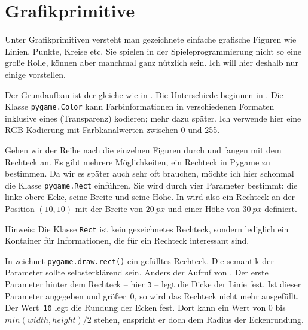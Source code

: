 \section{Grafikprimitive}

Unter Grafikprimitiven versteht man gezeichnete einfache grafische Figuren wie Linien, Punkte, Kreise etc. Sie spielen in der Spieleprogrammierung nicht so eine große Rolle, können aber manchmal ganz nützlich sein. Ich will hier deshalb nur einige vorstellen. 




Der Grundaufbau ist der gleiche wie in . Die Unterschiede beginnen in . Die Klasse \texttt{pygame.Color} kann Farbinformationen in verschiedenen Formaten inklusive eines  (Transparenz) kodieren; mehr dazu später. Ich verwende hier eine RGB-Kodierung mit Farbkanalwerten zwischen 0 und 255. 

Gehen wir der Reihe nach die einzelnen Figuren durch und fangen mit dem Rechteck an. Es gibt mehrere Möglichkeiten, ein Rechteck in Pygame zu bestimmen. Da wir es später auch sehr oft brauchen, möchte ich hier schonmal die Klasse \texttt{pygame.Rect} einführen. Sie wird durch vier Parameter bestimmt: die linke obere Ecke, seine Breite und seine Höhe. In  wird also ein Rechteck an der Position $(10,10)$ mit der Breite von $20~px$ und einer Höhe von $30~px$ definiert. 

Hinweis: Die Klasse \texttt{Rect} ist kein gezeichnetes Rechteck, sondern lediglich ein Kontainer für Informationen, die für ein Rechteck interessant sind. 

In  zeichnet \texttt{pygame.draw.rect()} ein gefülltes Rechteck. Die \Gls{semantik} der Parameter sollte selbsterklärend sein. Anders der Aufruf von . Der erste Parameter hinter dem Rechteck -- hier \texttt{3} -- legt die Dicke der Linie fest. Ist dieser Parameter angegeben und größer~0, so wird das Rechteck nicht mehr ausgefüllt. Der Wert~\texttt{10} legt die Rundung der Ecken fest. Dort kann ein Wert von 0 bis $min(width, height)/2$ stehen, enspricht er doch dem Radius der Eckenrundung.

